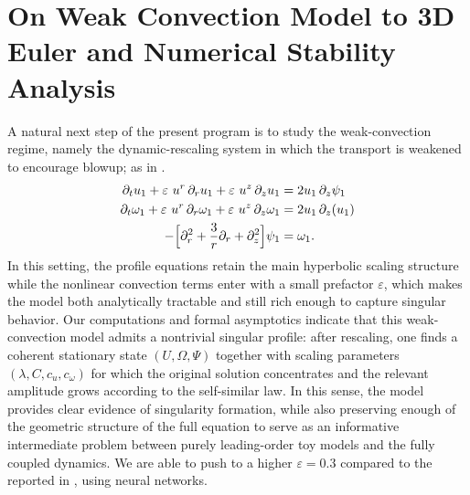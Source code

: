 \documentclass[12pt]{caltech_thesis}
\numberwithin{equation}{section}
\begin{document}
\section{On Weak Convection Model to 3D Euler and Numerical Stability Analysis}

A natural next step of the present program is to study the weak-convection regime, namely the dynamic-rescaling system in which the transport is weakened to encourage blowup; as in \cite{liu2017spatial}. \begin{align}
\label{eq:new}
\partial_t u_{1}
+ {\varepsilon} \ u^r\,\partial_r u_{1}
+ {\varepsilon} \ u^z\,\partial_z u_{1}
&= 2u_{1}\,\partial_z \psi_{1}  \\
\label{eq:transformed_2}
\partial_t \omega_{1}
+ {\varepsilon} \ u^r\,\partial_r \omega_{1}
+ {\varepsilon} \ u^z\,\partial_z \omega_{1}
&= 2u_{1}\,\partial_z(u_{1})  \\
\label{eq:transformed_3}
-\Bigl[\partial_r^2 + \frac{3}{r}\partial_r + \partial_z^2\Bigr]\psi_{1}
&= \omega_{1}.
\end{align} In this setting, the profile equations retain the main hyperbolic scaling structure while the nonlinear convection terms enter with a small prefactor $\varepsilon$, which makes the model both analytically tractable and still rich enough to capture singular behavior. Our computations and formal asymptotics indicate that this weak-convection model admits a nontrivial singular profile: after rescaling, one finds a coherent stationary state $(U,\Omega,\Psi)$ together with scaling parameters $(\lambda,C,c_u,c_\omega)$ for which the original solution concentrates and the relevant amplitude grows according to the self-similar law. In this sense, the model provides clear evidence of singularity formation, while also preserving enough of the geometric structure of the full equation to serve as an informative intermediate problem between purely leading-order toy models and the fully coupled dynamics. We are able to push to a higher $\varepsilon=0.3$ compared to the reported in \cite{liu2017spatial}, using neural networks.
\end{document}
